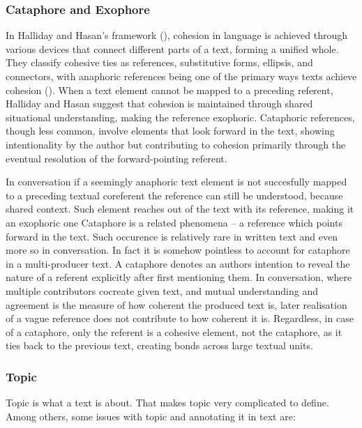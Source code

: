 \documentclass[12pt]{report}
\begin{document}
{\subsubsection{Cataphore and Exophore}
\par
    In Halliday and Hasan's framework (),
    cohesion in language is achieved through various devices that connect
    different parts of a text, forming a unified whole.
    They classify cohesive ties as
    references, substitutive forms, ellipsis, and connectors, with
    anaphoric references being one of the primary ways texts achieve cohesion ().
    When a text element cannot be mapped to a preceding referent,
    Halliday and Hasan suggest that cohesion is maintained through
    shared situational understanding, making the reference exophoric.
    Cataphoric references, though less common, involve
    elements that look forward in the text,
    showing intentionality by the author but contributing to
    cohesion primarily through the eventual resolution of the forward-pointing referent.

\par
    In conversation if a seemingly anaphoric text element is not succesfully mapped
    to a preceding textual coreferent
    the reference can still be understood, because shared context.
    Such element reaches out of the text with its reference, making it an exophoric one
    Cataphore is a related phenomena –
    a reference which points forward in the text.
    Such occurence is relatively rare in written text and even more so in conversation.
    In fact it is somehow pointless to account for cataphore in a multi-producer text.
    A cataphore denotes an authors intention to reveal
    the nature of a referent explicitly after first mentioning them.
    In conversation, where multiple contributors cocreate given text,
    and mutual understanding and agreement is the measure of
    how coherent the produced text is, later realisation of a vague reference
    does not contribute to how coherent it is.
    Regardless, in case of a cataphore,
    only the referent is a cohesive element,
    not the cataphore,
    as it ties back to the previous text, creating bonds across large textual units.

\subsubsection{Topic}
\par
    Topic is what a text is about.
    That makes topic very complicated to define.
    Among others, some issues with topic and annotating it in text are:

}
\end{document}
